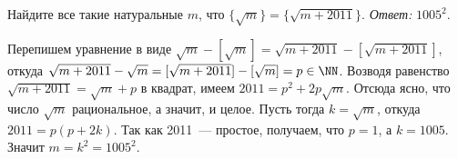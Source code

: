 \problem
Найдите все такие натуральные $m$, что
$\{ \sqrt{m} \} = \{ \sqrt{m+2011} \}$.
\solution
\emph{Ответ:} $1005^2$.
\par
Перепишем уравнение в виде
$\sqrt{m} - [\sqrt{m}] = \sqrt{m + 2011} - [\sqrt{m + 2011}]$,
откуда
\(
    \sqrt{m + 2011} - \sqrt{m}
=
    [\sqrt{m + 2011}] - [\sqrt{m}]
=
    p \in \NN
\).
Возводя равенство $\sqrt{m + 2011} = \sqrt{m} + p$ в квадрат, имеем
$2011 = p^2 + 2 p \sqrt{m}$.
Отсюда ясно, что число $\sqrt{m}$ рациональное, а значит, и целое.
Пусть тогда $k = \sqrt{m}$, откуда $2011 = p (p + 2 k)$.
Так как 2011~--- простое, получаем, что $p=1$, а $k = 1005$.
Значит $m = k^2 = 1005^2$.
\endproblem
